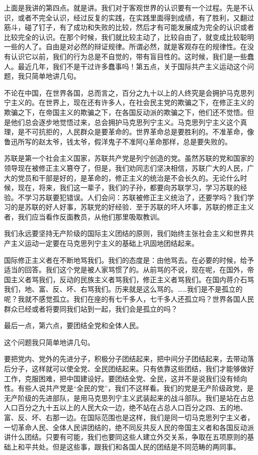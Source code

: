 上面是我讲的第四点。就是讲。我们对于客观世界的认识要有一个过程。先是不认识，或者不完全认识，经过反复的实践，在实践里面得到成绩，有了胜利，又翻过筋斗，碰了钉子，有了成功和失败的比较，然后才有可能发展成为完全的认识或者比较完全的认识。在那个时候，我们就比较主动了，比较自由了，就变成比较聪明一些的人了。自由是对必然的辩证规律。所谓必然，就是客观存在的规律性。在没有认识它以前，我们的行为总是不自觉的，带有盲目性的。这时候，我们是一些蠢人。最近几年，我们不是干过许多蠢事吗！第五点，关于国际共产主义运动这个问题，我只简单地讲几句。

不论在中国，在世界各国，总而言之，百分之九十以上的人终究是会拥护马克思列宁主义的。在世界上，现在还有许多人，在社会民主党的欺骗之下，在修正主义的欺骗之下，在帝国主义的欺骗之下，在各国反动派的欺骗之下，他们还不觉悟。但是他们总会逐步地觉悟过来，总会拥护马克思列宁主义。马克思列宁主义这个真理，是不可抗拒的，人民群众是要革命的。世界革命总是要胜利的。不准革命，像鲁迅所写的赵太爷，钱太爷，假洋鬼子不准阿Q革命那样，总是要失败的。

苏联是第一个社会主义国家，苏联共产党是列宁创造的党。虽然苏联的党和国家的领导现在被修正主义篡夺了，但是，我们劝同志们坚决相信，苏联广大的人民，广大的党员和干部是好的，是革命的，修正主义的统治是不会长久的。无论什么时候，现在，将来，我们这一辈子，我们的子孙，都要向苏联学习，学习苏联的经验。不学习苏联要犯错误。人们会问：苏联被修正主义统治了，还要学吗？我们学习的是苏联的好人好事，苏联党的好经验．至于苏联的坏人坏事，苏联的修正主义者，我们应当看作反面教员，从他们那里吸取教训。

我们永远要坚持无产阶级的国际主义团结的原则，我们始终主张社会主义和世界共产主义运动一定要在马克思列宁主义的基础上巩固地团结起来。

国际修正主义者在不断地骂我们。我们的态度是：由他骂去。在必要的时候，给予适当的回答。我们这个党是被人家骂惯了的。从前骂的不说，现在呢，在国外，帝国主义者骂我们，反动的民族主义者骂我们，修正主义者骂我们。在国内蒋介石骂我们，地、富、反、坏、右骂我们。历来就是这么骂的。……我们是不是孤立的呢？我就不感觉孤立。我们在座的有七千多人，七千多人还孤立吗？世界各国人民群众已经或者将要同我们站到一起，我们会是孤立的吗？

最后一点，第六点，要团结全党和全体人民。

这个问题我只简单地讲几句。

要把党内、党外的先进分子，积极分子团结起来，把中间分子团结起来，去带动落后分子，这样就可以使全党、全民团结起来。只有依靠这些团结，我们才能够做好工作，克服困难，把中国建设好。要团结全党、全民，这并不是说我们没有倾向性。有些人说共产党是“全民的党”，我们不这样看。我们的党是无产阶级政党，是无产阶级的先进部队，是用马克思列宁主义武装起来的战斗部队。我们是站在占总人口百分之九十五以上的人民大众一边，绝不站在占总人口百分之四、五的地、富、反、坏、右那一边。在国际范围也是这样，我们是同一切马克思列宁主义者，一切革命人民、全体人民讲团结的，绝不同反共反人民的帝国主义者和各国反动派讲什么团结。只要有可能，我们也要同这些人建立外交关系，争取在五项原则的基础上和平共处。但是这些事，跟我们和各国人民的团结是不同范畴的两同事。

